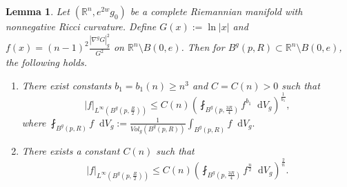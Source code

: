 \documentclass[12pt]{amsart}
\theoremstyle{plain}
\newtheorem{lemma}[theorem]{Lemma}
\theoremstyle{definition}
\theoremstyle{remark}     %
\numberwithin{equation}{section}
\newcommand{\dd}{\mathop{}\!\mathrm{d}}%
\begin{document}
\begin{lemma}\label{lemma. weak Harnack ineq. for grad G}
    Let $(\mathbb{R}^n,e^{2w}g_0)$ be a complete Riemannian manifold with nonnegative Ricci curvature. Define $G(x):=\ln |x|$ and $f(x)=(n-1)^2\frac{|\nabla^g G|_g^2}{G^2}$ on $\mathbb{R}^n\setminus B(0,e)$. Then for $B^g(p,R)\subset \mathbb{R}^n\setminus B(0,e)$, the following holds.
    \begin{enumerate}
        \item There exist constants $b_1=b_1(n)\geq n^3$ and $C=C(n)>0$ such that
        \[
            |f|_{L^{\infty}(B^g(p,\frac{R}{2}))}
            \leq C(n)
            \left(
            \fint_{B^g(p,\frac{3R}{4})}f^{b_1}\dd V_g
            \right)^{\frac{1}{b_1}},
        \]
        where $\fint_{B^g(p,R)}f\dd V_g:=\frac{1}{Vol_g(B^g(p,R))}\int_{B^g(p,R)}f\dd V_g.$
        \item There exists a constant $C(n)$  such that
        \[
            |f|_{L^{\infty}(B^g(p,\frac{R}{2}))}
            \leq C(n)
            \left(
            \fint_{B^g(p,\frac{3R}{4})}f^{\frac{n}{2}}\dd V_g
            \right)^{\frac{2}{n}}.
        \]
    \end{enumerate}
\end{lemma}
\end{document}
